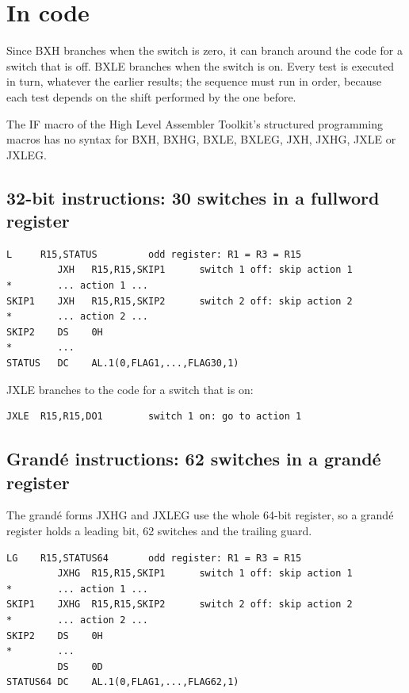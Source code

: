\documentclass[11pt]{article}
\begin{document}
\section{In code}\label{sec:code}

Since BXH branches when the switch is zero, it can branch around the code
for a switch that is off. BXLE branches when the switch is on. Every test is
executed in turn, whatever the earlier results; the sequence must run in
order, because each test depends on the shift performed by the one before.

The IF macro of the High Level Assembler Toolkit's structured programming
macros has no syntax for BXH, BXHG, BXLE, BXLEG, JXH, JXHG, JXLE or JXLEG.

\subsection{32-bit instructions: 30 switches in a fullword register}

\begin{Verbatim}[fontsize=\small]
         L     R15,STATUS         odd register: R1 = R3 = R15
         JXH   R15,R15,SKIP1      switch 1 off: skip action 1
*        ... action 1 ...
SKIP1    JXH   R15,R15,SKIP2      switch 2 off: skip action 2
*        ... action 2 ...
SKIP2    DS    0H
*        ...
STATUS   DC    AL.1(0,FLAG1,...,FLAG30,1)
\end{Verbatim}

JXLE branches to the code for a switch that is on:

\begin{Verbatim}[fontsize=\small]
         JXLE  R15,R15,DO1        switch 1 on: go to action 1
\end{Verbatim}

\subsection{Grandé instructions: 62 switches in a grandé register}

The grandé forms JXHG and JXLEG use the whole 64-bit register, so a grandé
register holds a leading bit, 62 switches and the trailing guard.

\begin{Verbatim}[fontsize=\small]
         LG    R15,STATUS64       odd register: R1 = R3 = R15
         JXHG  R15,R15,SKIP1      switch 1 off: skip action 1
*        ... action 1 ...
SKIP1    JXHG  R15,R15,SKIP2      switch 2 off: skip action 2
*        ... action 2 ...
SKIP2    DS    0H
*        ...
         DS    0D
STATUS64 DC    AL.1(0,FLAG1,...,FLAG62,1)
\end{Verbatim}
\end{document}
